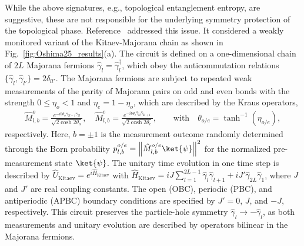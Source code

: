 \documentclass[preprint,pteplogo]{ptephy_v2}%
\numberwithin{equation}{section}
\theoremstyle{definition}
\begin{document}
While the above signatures, e.g., topological entanglement entropy, are suggestive, these are not responsible for the underlying symmetry protection of the topological phase.
Reference~\cite{oshima2025topology} addressed this issue.
It considered a weakly monitored variant of the Kitaev-Majorana chain as shown in Fig.~\ref{fig:Oshima25_results}(a).
The circuit is defined on a one-dimensional chain of $2L$ Majorana fermions $\hat{\gamma}_l = \hat{\gamma}_l^\dagger$, which obey the anticommutation relations $\{\hat{\gamma}_l, \hat{\gamma}_{l'}\}=2\delta_{ll'}$. 
The Majorana fermions are subject to repeated weak measurements of the parity of Majorana pairs on odd and even bonds with the strength $0\leq\eta_o<1$ and $\eta_e=1-\eta_o$, which are described by the Kraus operators,
\begin{align}
    \hat{M}_{l,b}^o = \frac{e^{-ib\theta_o\hat{\gamma}_{2l-1}\hat{\gamma}_{2l}}}{\sqrt{2\cosh2\theta_o}}, \quad
    \hat{M}_{l,b}^e = \frac{e^{-ib\theta_e\hat{\gamma}_{2l}\hat{\gamma}_{2l+1}}}{\sqrt{2\cosh2\theta_e}},
    \qquad\mathrm{with}\quad
    \theta_{o/e}=\tanh^{-1}(\eta_{o/e}),
\end{align}
respectively.
Here, $b=\pm1$ is the measurement outcome randomly determined through the Born probability $p_{l,b}^{o/e} = \left\| \hat{M}_{l,b}^{o/e}\ket{\psi}\right\|^2$ for the normalized pre-measurement state $\ket{\psi}$.
The unitary time evolution in one time step is described by $\hat{U}_{\mathrm{Kitaev}}=e^{i\hat{H}_{\mathrm{Kitaev}}}$ with $\hat{H}_{\mathrm{Kitaev}}=iJ\sum_{l=1}^{2L-1}\hat{\gamma}_l\hat{\gamma}_{l+1}+iJ'\hat{\gamma}_{2L}\hat{\gamma}_1$, where $J$ and $J'$ are real coupling constants.
The open (OBC), periodic (PBC), and antiperiodic (APBC) boundary conditions are specified by $J'=0$, $J$, and $-J$, respectively.
This circuit preserves the particle-hole symmetry $\hat{\gamma}_l \to -\hat{\gamma}_l$, as both measurements and unitary evolution are described by operators bilinear in the Majorana fermions.
\end{document}
